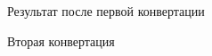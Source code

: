 \documentclass[
  english,
  russian,
  12pt,
  a4paper,
  DIV=11,
  numbers=noendperiod]{scrreprt}
\begin{document}
\begin{figure}


\caption{\label{fig-029}Результат после первой конвертации}

\end{figure}%

\begin{figure}


\caption{\label{fig-030}Вторая конвертация}

\end{figure}%
\end{document}
